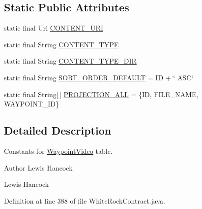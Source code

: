 \subsection*{Static Public Attributes}
\begin{DoxyCompactItemize}
\item 
static final Uri \hyperlink{classuk_1_1ac_1_1swan_1_1digitaltrails_1_1database_1_1_white_rock_contract_1_1_waypoint_video_a390ba6a07825a8da120f2711fd0ca3bf}{C\+O\+N\+T\+E\+N\+T\+\_\+\+U\+R\+I}
\item 
static final String \hyperlink{classuk_1_1ac_1_1swan_1_1digitaltrails_1_1database_1_1_white_rock_contract_1_1_waypoint_video_a445d2144990a925d7daa165290cf7504}{C\+O\+N\+T\+E\+N\+T\+\_\+\+T\+Y\+P\+E}
\item 
static final String \hyperlink{classuk_1_1ac_1_1swan_1_1digitaltrails_1_1database_1_1_white_rock_contract_1_1_waypoint_video_af4f61e30876e0a51b2be7e54462d1724}{C\+O\+N\+T\+E\+N\+T\+\_\+\+T\+Y\+P\+E\+\_\+\+D\+I\+R}
\item 
static final String \hyperlink{classuk_1_1ac_1_1swan_1_1digitaltrails_1_1database_1_1_white_rock_contract_1_1_waypoint_video_abb272973966cf7ebf8b6eb675e3162cb}{S\+O\+R\+T\+\_\+\+O\+R\+D\+E\+R\+\_\+\+D\+E\+F\+A\+U\+L\+T} = I\+D + \char`\"{} A\+S\+C\char`\"{}
\item 
static final String\mbox{[}$\,$\mbox{]} \hyperlink{classuk_1_1ac_1_1swan_1_1digitaltrails_1_1database_1_1_white_rock_contract_1_1_waypoint_video_a0e70603dc2094252b5deebe22bbd296c}{P\+R\+O\+J\+E\+C\+T\+I\+O\+N\+\_\+\+A\+L\+L} = \{I\+D, F\+I\+L\+E\+\_\+\+N\+A\+M\+E, W\+A\+Y\+P\+O\+I\+N\+T\+\_\+\+I\+D\}
\end{DoxyCompactItemize}


\subsection{Detailed Description}
Constants for \hyperlink{classuk_1_1ac_1_1swan_1_1digitaltrails_1_1database_1_1_white_rock_contract_1_1_waypoint_video}{Waypoint\+Video} table. 

\begin{DoxyAuthor}{Author}
Lewis Hancock 

Lewis Hancock 
\end{DoxyAuthor}


Definition at line 388 of file White\+Rock\+Contract.\+java.



